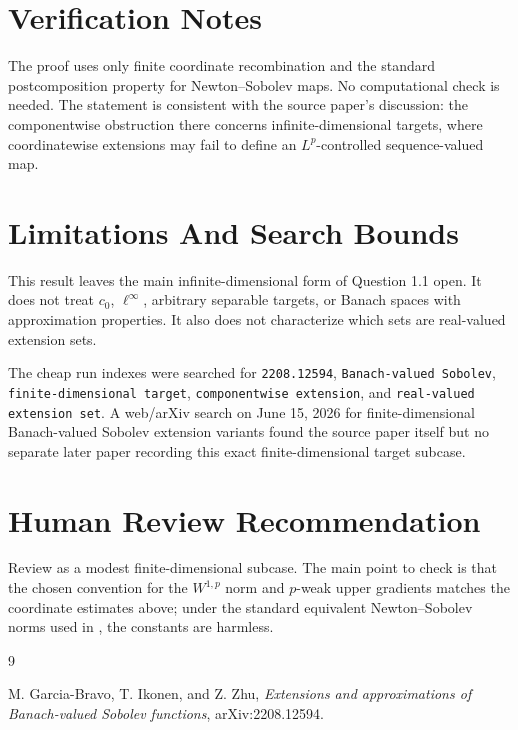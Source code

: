 \documentclass[11pt]{article}
\begin{document}
\section*{Verification Notes}

The proof uses only finite coordinate recombination and the standard
postcomposition property for Newton--Sobolev maps. No computational check is
needed. The statement is consistent with the source paper's discussion:
the componentwise obstruction there concerns infinite-dimensional targets,
where coordinatewise extensions may fail to define an $L^p$-controlled
sequence-valued map.

\section*{Limitations And Search Bounds}

This result leaves the main infinite-dimensional form of Question 1.1 open.
It does not treat $c_0$, $\ell^\infty$, arbitrary separable targets, or
Banach spaces with approximation properties. It also does not characterize
which sets are real-valued extension sets.

The cheap run indexes were searched for \texttt{2208.12594},
\texttt{Banach-valued Sobolev}, \texttt{finite-dimensional target},
\texttt{componentwise extension}, and \texttt{real-valued extension set}. A
web/arXiv search on June 15, 2026 for finite-dimensional Banach-valued Sobolev
extension variants found the source paper itself but no separate later paper
recording this exact finite-dimensional target subcase.

\section*{Human Review Recommendation}

Review as a modest finite-dimensional subcase. The main point to check is that
the chosen convention for the $W^{1,p}$ norm and $p$-weak upper gradients
matches the coordinate estimates above; under the standard equivalent
Newton--Sobolev norms used in \cite{GIZ}, the constants are harmless.

\begin{thebibliography}{9}

M. Garcia-Bravo, T. Ikonen, and Z. Zhu,
\emph{Extensions and approximations of Banach-valued Sobolev functions},
arXiv:2208.12594.

\end{thebibliography}
\end{document}
